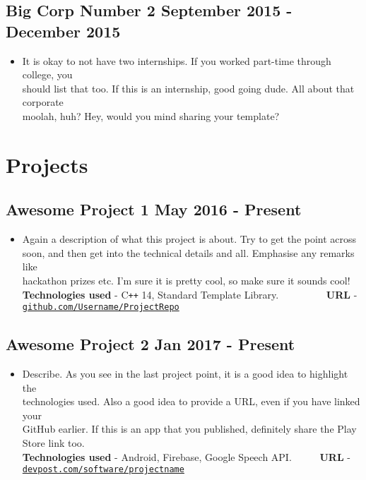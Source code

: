 \documentclass{article}
\begin{document}
\subsection*{Big Corp Number 2 \hspace{290pt} \normalsize \textmd{September 2015 - December 2015}}
\begin{itemize}
    \item It is okay to not have two internships. If you worked part-time through college, you\\ should list that too. If this is an internship, good going dude. All about that corporate\\ moolah, huh? Hey, would you mind sharing your template?   
    \end{itemize} 

\section*{Projects}

\subsection*{Awesome Project 1 \hspace{350pt} {\normalsize \textmd{May 2016 - Present}}}
    \begin{itemize}
        \item Again a description of what this project is about. Try to get the point across\\ soon, and then get into the technical details and all. Emphasise any remarks like \\hackathon prizes etc. I'm sure it is pretty cool, so make sure it sounds cool!\\
        
        \textbf{Technologies used} - C\texttt{++} 14, Standard Template Library. \ \ \ \ \ \ \ \ \ \textbf{URL} - \href{http://www.github.com/TusharRakheja/Autolang}{\texttt{github.com/Username/ProjectRepo}}
    \end{itemize}

\subsection*{Awesome Project 2 \hspace{350pt} {\normalsize \textmd{Jan 2017 - Present}}}
    \begin{itemize}
        \item Describe. As you see in the last project point, it is a good idea to highlight the\\ technologies used. Also a good idea to provide a URL, even if you have linked your\\ GitHub earlier. If this is an app that you published, definitely share the Play Store link too.\\
        
        \textbf{Technologies used} - Android, Firebase, Google Speech API. \ \ \ \ \ \textbf{URL} - \href{https://devpost.com/software/babel-69t48z}{\texttt{devpost.com/software/projectname}}
    \end{itemize}    
\end{document}
